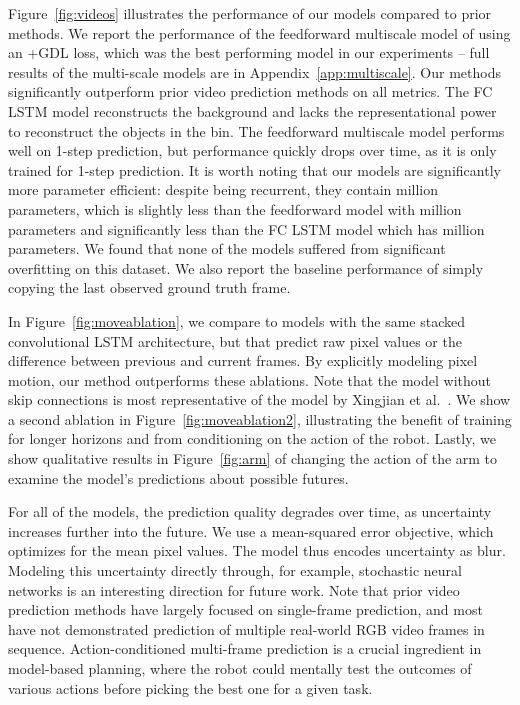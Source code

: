 \documentclass{article}
\newcommand{\atari}{acvpa-oglls-15}
\newcommand{\nyu}{vpbmse-mcl-16}
\begin{document}
Figure~\ref{fig:videos} illustrates the performance of our models compared to prior methods.
We report the performance of the feedforward multiscale model of \cite{\nyu} using an +GDL loss, which was the best performing model in our experiments
-- full results of the multi-scale models are in Appendix~\ref{app:multiscale}.
Our methods significantly outperform prior video prediction methods on all metrics. The FC LSTM model \cite{\atari}
reconstructs the background and lacks the representational power to reconstruct the objects in the bin.
The feedforward multiscale model performs well on 1-step prediction, but performance quickly drops over time, as it is only trained for 1-step prediction.
It is worth noting that our models
are significantly more parameter efficient: despite being recurrent, they contain  million parameters, which is slightly less than the feedforward model with
 million parameters and significantly less than the FC LSTM model which has  million parameters.
We found that none of the models suffered from significant overfitting on this dataset. We also report the baseline performance
of simply copying the last observed ground truth frame.


In Figure~\ref{fig:moveablation}, we compare to models with the same stacked convolutional LSTM architecture,
but that predict raw pixel values or the difference between previous and current frames. By explicitly
modeling pixel motion, our method outperforms these ablations. Note that the model without skip connections is most representative of the model by Xingjian et al.~\cite{xcwyw-clstm-15}.
We show a second ablation in
Figure~\ref{fig:moveablation2}, illustrating the benefit of training for longer horizons and from conditioning on the action of the robot.
Lastly, we show qualitative results in Figure~\ref{fig:arm} of changing the action of the arm to examine the model's predictions about possible futures.


For all of the models, the prediction quality degrades over time, as uncertainty increases further into the future. We use a mean-squared error objective, which
optimizes for the mean pixel
values. The model thus encodes uncertainty as blur.
Modeling this uncertainty directly through, for example, stochastic neural networks is an interesting direction for future
work. Note that prior video prediction methods have largely focused on
single-frame prediction, and most have not demonstrated prediction of multiple real-world RGB video frames in sequence.
Action-conditioned multi-frame prediction is a crucial ingredient in model-based planning, where the robot could mentally test the outcomes of various actions before picking
the best one for a given task.
\end{document}
